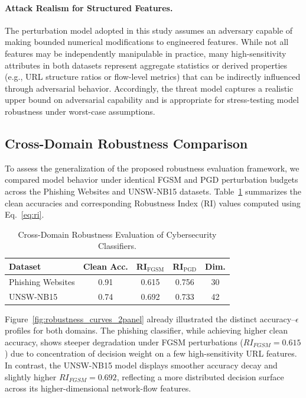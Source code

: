 \documentclass[a4paper,twoside]{article}
\begin{document}
\paragraph{Attack Realism for Structured Features.}
The perturbation model adopted in this study assumes an adversary capable of making bounded numerical modifications
to engineered features.
While not all features may be independently manipulable in practice, many high-sensitivity attributes in both datasets
represent aggregate statistics or derived properties (e.g., URL structure ratios or flow-level metrics)
that can be indirectly influenced through adversarial behavior.
Accordingly, the threat model captures a realistic upper bound on adversarial capability
and is appropriate for stress-testing model robustness under worst-case assumptions.

\subsection{Cross-Domain Robustness Comparison}

To assess the generalization of the proposed robustness evaluation framework,
we compared model behavior under identical FGSM and PGD perturbation budgets across
the Phishing Websites and UNSW-NB15 datasets.
Table~\ref{tab:cross_domain} summarizes the clean accuracies and corresponding
Robustness Index (RI) values computed using Eq.~\ref{eq:ri}.

\begin{table}[htbp]
\caption{Cross-Domain Robustness Evaluation of Cybersecurity Classifiers.}
\centering
\setlength{\tabcolsep}{6pt}
\begin{tabular}{l c c c c}
\toprule
Dataset & Clean Acc. & RI$_{\text{FGSM}}$ &
RI$_{\text{PGD}}$ & Dim. \\
\midrule
Phishing Websites & 0.91 & 0.615 & 0.756 & 30 \\
UNSW-NB15 & 0.74 & 0.692 & 0.733 & 42 \\
\bottomrule
\end{tabular}
\label{tab:cross_domain}
\end{table}

Figure~\ref{fig:robustness_curves_2panel} already illustrated the distinct
accuracy–$\epsilon$ profiles for both domains.
The phishing classifier, while achieving higher clean accuracy,
shows steeper degradation under FGSM perturbations
($RI_{FGSM}=0.615$) due to concentration of decision weight on a few
high-sensitivity URL features.
In contrast, the UNSW-NB15 model displays smoother accuracy decay and slightly higher
$RI_{FGSM}=0.692$, reflecting a more distributed decision surface
across its higher-dimensional network-flow features.
\end{document}
